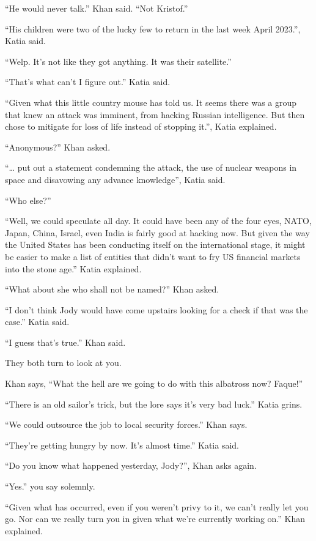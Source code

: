 \documentclass[17pt, twoside, a5paper, openright, extrafontsizes]{memoir}
\begin{document}
``He would never talk.'' Khan said. ``Not Kristof.''

``His children were two of the lucky few to return in the last week
April 2023.'', Katia said.

``Welp. It's not like they got anything. It was their satellite.''

``That's what can't I figure out.'' Katia said.

``Given what this little country mouse has told us. It seems there was a
group that knew an attack was imminent, from hacking Russian
intelligence. But then chose to mitigate for loss of life instead of
stopping it.'', Katia explained.

``Anonymous?'' Khan asked.

``\ldots{} put out a statement condemning the attack, the use of nuclear
weapons in space and disavowing any advance knowledge'', Katia said.

``Who else?''

``Well, we could speculate all day. It could have been any of the four
eyes, NATO, Japan, China, Israel, even India is fairly good at hacking
now. But given the way the United States has been conducting itself on
the international stage, it might be easier to make a list of entities
that didn't want to fry US financial markets into the stone age.'' Katia
explained.

``What about she who shall not be named?'' Khan asked.

``I don't think Jody would have come upstairs looking for a check if
that was the case.'' Katia said.

``I guess that's true.'' Khan said.

They both turn to look at you.

Khan says, ``What the hell are we going to do with this albatross now?
Faque!''

``There is an old sailor's trick, but the lore says it's very bad
luck.'' Katia grins.

``We could outsource the job to local security forces.'' Khan says.

``They're getting hungry by now. It's almost time.'' Katia said.

``Do you know what happened yesterday, Jody?'', Khan asks again.

``Yes.'' you say solemnly.

``Given what has occurred, even if you weren't privy to it, we can't
really let you go. Nor can we really turn you in given what we're
currently working on.'' Khan explained.
\end{document}
